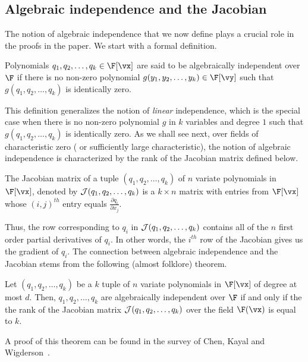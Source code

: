 %
%

%
%

\subsection{Algebraic independence and the Jacobian}
The notion of algebraic independence that we now define plays a crucial role in the proofs in the paper. We start with a formal definition. 
\begin{definition}\label{def:algebraic independence}
Polynomials $q_1, q_2, \ldots, q_k \in  \F[\vx]$ are said to be algebraically independent over $\F$ if there is no non-zero polynomial $g(y_1, y_2, \ldots, y_k) \in \F[\vy]$ such that $g(q_1, q_2, \ldots, q_k)$ is identically zero. 
\end{definition}
This definition generalizes the notion of \emph{linear} independence, which is the special case when there is no non-zero polynomial $g$ in $k$ variables and degree $1$ such that $g(q_1, q_2, \ldots, q_k)$ is identically zero. As we shall see next, over fields of characteristic zero ( or sufficiently large characteristic), the notion of algebraic independence is characterized by the rank of the Jacobian matrix defined below. 
\begin{definition}\label{def:jacobian}
The Jacobian matrix of a tuple $(q_1, q_2, \ldots, q_k)$ of $n$ variate polynomials in $\F[\vx]$, denoted by ${\cal J}(q_1, q_2, \ldots, q_k)$ is a $k \times n$ matrix with entries from $\F[\vx]$ whose $(i, j)^{th}$ entry equals $\frac{\partial q_i}{\partial x_j}$. 
\end{definition}
Thus, the row corresponding to $q_i$ in ${\cal J}(q_1, q_2, \ldots, q_k)$ contains all of the $n$ first order partial derivatives of $q_i$. In other words, the $i^{th}$ row of the Jacobian gives us the gradient of $q_i$. The connection between algebraic independence and the Jacobian stems from the following (almost folklore) theorem. 
\begin{theorem}\label{thm:jac and alg ind}
Let $\left(q_1, q_2, \ldots, q_k \right)$ be a $k$ tuple of $n$ variate polynomials in $\F[\vx]$ of degree at most $d$. Then, $q_1, q_2, \ldots, q_k$ are algebraically independent over $\F$ if and only if the the rank of the Jacobian matrix ${\cal J}(q_1, q_2, \ldots, q_k)$ over the field $\F(\vx)$ is equal to $k$.
\end{theorem}
A proof of this theorem can be found in the survey of Chen, Kayal and Wigderson~\cite[Chapter 3]{r4}. 


